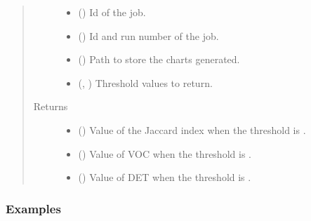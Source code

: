 \documentclass[letterpaper,10pt,english]{sphinxmanual}
\begin{document}
\begin{fulllineitems}
\begin{quote}
\begin{description}
\begin{itemize}
\item {} 
 () \textendash{} Id of the job.

\item {} 
 () \textendash{} Id and run number of the job.

\item {} 
 () \textendash{} Path to store the charts generated.

\item {} 
 (, ) \textendash{} Threshold values to return.

\end{itemize}

\item[{Returns}] \leavevmode
\begin{itemize}
\item {} 
 () \textendash{} Value of the Jaccard index when the threshold is .

\item {} 
 () \textendash{} Value of VOC when the threshold is .

\item {} 
 () \textendash{} Value of DET when the threshold is .

\end{itemize}


\end{description}\end{quote}
\subsubsection*{Examples}

\begin{sphinxVerbatim}[commandchars=\\\{\}]
    
        
       
\end{sphinxVerbatim}


\end{fulllineitems}
\end{document}
